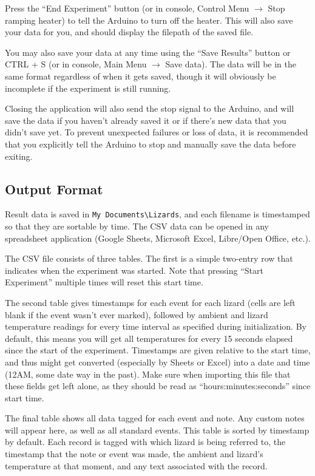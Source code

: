 \documentclass[twoside,a4paper]{refart}
\newcommand{\Lizards}[0]{LiThRTs }
\begin{document}
Press the ``End Experiment'' button (or in console, Control Menu $\rightarrow$ Stop ramping heater) to tell the Arduino to turn off the heater. This will also save your data for you, and should display the filepath of the saved file.

You may also save your data at any time using the ``Save Results'' button or CTRL + S (or in console, Main Menu $\rightarrow$ Save data). The data will be in the same format regardless of when it gets saved, though it will obviously be incomplete if the experiment is still running.

Closing the application will also send the stop signal to the Arduino, and will save the data if you haven't already saved it or if there's new data that you didn't save yet. To prevent unexpected failures or loss of data, it is recommended that  you explicitly tell the Arduino to stop and manually save the data before exiting.

\subsection{Output Format}

Result data is saved in \verb|My Documents\Lizards|, and each filename is timestamped so that they are sortable by time. The CSV data can be opened in any spreadsheet application (Google Sheets, Microsoft Excel, Libre/Open Office, etc.).

The CSV file consists of three tables. The first is a simple two-entry row that indicates when the experiment was started. Note that pressing ``Start Experiment'' multiple times will reset this start time.

The second table gives timestamps for each event for each lizard (cells are left blank if the event wasn't ever marked), followed by ambient and lizard temperature readings for every time interval as specified during initialization. By default, this means you will get all temperatures for every 15 seconds elapsed since the start of the experiment. Timestamps are given relative to the start time, and thus might get converted (especially by Sheets or Excel) into a date and time (12AM, some date way in the past). Make sure when importing this file that these fields get left alone, as they should be read as ``hours:minutes:seconds'' since start time.

The final table shows all data tagged for each event and note. Any custom notes will appear here, as well as all standard events. This table is sorted by timestamp by default. Each record is tagged with which lizard is being referred to, the timestamp that the note or event was made, the ambient and lizard's temperature at that moment, and any text associated with the record.
\end{document}
